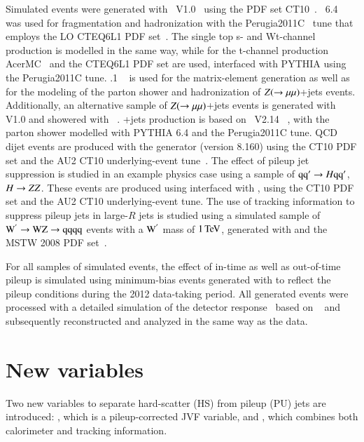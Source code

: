 \documentclass{atlasnote}
\begin{document}
Simulated \ttbar events were generated with \Powheg~V1.0~\cite{Alioli:2010xd,Frixione:2007vw,Nason:2004rx} using
the PDF set CT10~\cite{Lai:2010vv}.
\PY~6.4~\cite{Sjostrand:2006za} was used for fragmentation and hadronization with the Perugia2011C~\cite{Skands:2010ak}
tune that employs the LO CTEQ6L1 PDF set~\cite{Pumplin:2002vw}. The single top s- and Wt-channel production is modelled in the same way, while for the 
t-channel production AcerMC~\cite{Kersevan:2004yg} and the CTEQ6L1 PDF set are used, interfaced with PYTHIA using the Perugia2011C tune.
.1 ~\cite{Gleisberg:2008ta} is used for the  matrix-element generation as well as for the modeling of the parton shower and hadronization
of $Z(\rightarrow\mu\mu)$+jets events. Additionally, an alternative sample of $Z(\rightarrow\mu\mu)$+jets events is generated with \Powheg V1.0 and showered with \PYTHIAeight~\cite{Sjostrand:2007gs}.
\Wboson+jets production is based on \ALPGEN~V2.14 ~\cite{Mangano:2002ea}, with the parton shower modelled with PYTHIA 6.4 and the Perugia2011C tune.
QCD dijet events are produced with the \PYTHIAeight generator (version 8.160) using the CT10 PDF set and the AU2 CT10 underlying-event tune~\cite{ATL-PHYS-PUB-2012-003}.
The effect of pileup jet suppression is studied in an example physics case using a sample of ${\mathrm{q}} {\mathrm{q}}^{\prime} \rightarrow H {\mathrm{q}} {\mathrm{q}}^{\prime}$, $H \rightarrow ZZ$. These events are produced using \Powheg interfaced 
with \PYTHIAeight, using the CT10 PDF set and the AU2 CT10 underlying-event tune.
The use of tracking information to suppress pileup jets in large-$R$ jets is studied using a simulated sample of $\rm W^{'} \rightarrow WZ \rightarrow qqqq$ events with a $\rm W^{'}$ mass of $1\,\text{Te\hspace{-.08em}V}$, 
generated with \PYTHIAeight and the MSTW 2008 PDF set~\cite{Martin:2009iq}.

For all samples of simulated events, the effect of in-time as well as out-of-time pileup is simulated using minimum-bias events generated with \PYTHIAeight to reflect the 
pileup conditions during the 2012 data-taking period. 
All generated events were processed with a detailed simulation of the \ATLAS detector response~\cite{Aad:2010ah} based on \GEANTfour~\cite{Agostinelli:2002hh}
and subsequently reconstructed and analyzed in the same way as the data. 


\section{New variables}
\label{sec:newvars}
Two new variables to separate hard-scatter (HS) from pileup (PU) jets are introduced: \cJVF, which is a pileup-corrected JVF variable, 
and \RpT, which combines both calorimeter and tracking information. 
\end{document}

